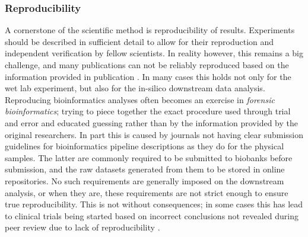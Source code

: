 \begin{justify}
\subsubsection{Reproducibility}

A cornerstone of the scientific method is reproducibility of results. Experiments should be described in sufficient detail to allow for their reproduction and independent verification by fellow scientists. In reality however, this remains a big challenge, and many publications can not be reliably reproduced based on the information provided in publication \cite{baggerly2009reproducible,kim2018reproducibility}. In many cases this holds not only for the wet lab experiment, but also for the in-silico downstream data analysis. Reproducing bioinformatics analyses often becomes an exercise in \textit{forensic bioinformatics}; trying to piece together the exact procedure used through trial and error and educated guessing rather than by the information provided by the original researchers. In part this is caused by journals not having clear submission guidelines for bioinformatics pipeline descriptions as they do for the physical samples. The latter are commonly required to be submitted to biobanks before submission, and the raw datasets generated from them to be stored in online repositories. No such requirements are generally imposed on the downstream analysis, or when they are, these requirements are not strict enough to ensure true reproducibility. This is not without consequences; in some cases this has lead to clinical trials being started based on incorrect conclusions not revealed during peer review due to lack of reproducibility \cite{baggerly2009reproducible}.

\end{justify}
